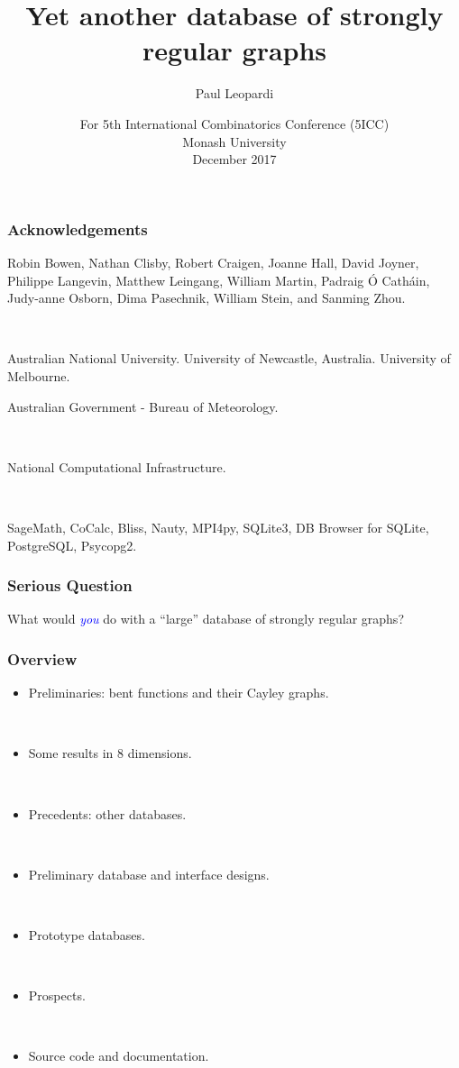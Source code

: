 \documentclass[pdf,sprung,slideColor,nocolorBG]{beamer}
\title{Yet another database of strongly regular graphs}
\author{Paul Leopardi}
\date{For 5th International Combinatorics Conference (5ICC)
\\
Monash University
\\
December 2017}
\institute{University of Melbourne
\\
Australian Government - Bureau of Meteorology}
\newcommand{\Emph}[1]{\emph{\textcolor{blue}{#1}}}
\begin{document}
\frame{\titlepage}
\begin{frame}
\frametitle{Acknowledgements}
\begin{center}
Robin Bowen,
Nathan Clisby,
Robert Craigen,
Joanne Hall,
David Joyner,
Philippe Langevin,
Matthew Leingang,
William Martin,
Padraig {\'O} Cath{\'a}in,
Judy-anne Osborn,
Dima Pasechnik,
William Stein, and
Sanming Zhou.

~

Australian National University. University of Newcastle, Australia. University of Melbourne.

Australian Government - Bureau of Meteorology.

~

National Computational Infrastructure.

~

SageMath, CoCalc, Bliss, Nauty, MPI4py, SQLite3, DB Browser for SQLite, PostgreSQL, Psycopg2.
\end{center}
\end{frame}

\begin{frame}
\frametitle{Serious Question}
\begin{center}
\vspace{+10mm}
\large{}
What would \Emph{you} do with a ``large'' database of strongly regular graphs?
\normalsize{}
\end{center}
\end{frame}

\begin{frame}
\frametitle{Overview}
\begin{itemize}
\item
Preliminaries: bent functions and their Cayley graphs.

~

\item
Some results in 8 dimensions.

~

\item
Precedents: other databases.

~

\item
Preliminary database and interface designs.

~

\item
Prototype databases.

~

\item
Prospects.

~

\item
Source code and documentation.
\end{itemize}

\end{frame}
\end{document}
